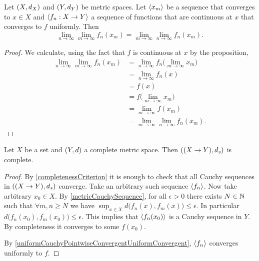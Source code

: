 \begin{corollary} \label{swapLimitsUniformConvergenceMetricSpaces}
Let $\sSet{X, d_X}$ and $\sSet{Y,d_Y}$ be metric spaces. Let  $\left\langle x_m \right\rangle$ be a sequence that converges to $x\in X$ and $\left\langle f_n: X\to Y \right\rangle$ a sequence of functions that are continuous at $x$ that converges to $f$ uniformly. Then
\[ \lim_{n\to \infty}\lim_{m\to \infty} f_n(x_m) = \lim_{m\to \infty}\lim_{n\to \infty} f_n(x_m). \]
\end{corollary}
\begin{proof}
We calculate, using the fact that $f$ is continuous at $x$ by the proposition,
\begin{align*}
\lim_{n\to \infty}\lim_{m\to \infty} f_n(x_m) &= \lim_{n\to \infty} f_n\big( \lim_{m\to \infty} x_m\big) \\
&= \lim_{n\to \infty} f_n(x) \\
&= f(x) \\
&= f\big(\lim_{m\to \infty}x_m\big) \\
&= \lim_{m\to \infty}f(x_m) \\
&= \lim_{m\to \infty}\lim_{n\to \infty} f_n(x_m).
\end{align*}
\end{proof}


\begin{lemma} \label{supmetricComplete}
Let $X$ be a set and $\sSet{Y,d}$ a complete metric space. Then $\sSet{(X\to Y), d_s}$ is complete.
\end{lemma}
\begin{proof}
By \ref{completenessCriterion} it is enough to check that all Cauchy sequences in $\sSet{(X\to Y), d_s}$ converge. Take an arbitrary such sequence $\left\langle f_n \right\rangle$. Now take arbitrary $x_0\in X$. By \ref{metricCauchySequence}, for all $\epsilon > 0$ there exists $N \in \mathbb{N}$ such that $\forall m,n\geq N$ we have $\sup_{x\in X}d\big(f_n(x), f_m(x)\big) \leq \epsilon$. In particular $d\big(f_n(x_0), f_m(x_0)\big) \leq \epsilon$. This implies that $\left\langle f_n(x_0) \right\rangle$ is a Cauchy sequence in $Y$. By completeness it converges to some $f(x_0)$.

By \ref{uniformCauchyPointwiseConvergentUniformConvergent}, $\left\langle f_n \right\rangle$ converges uniformly to $f$.
\end{proof}


